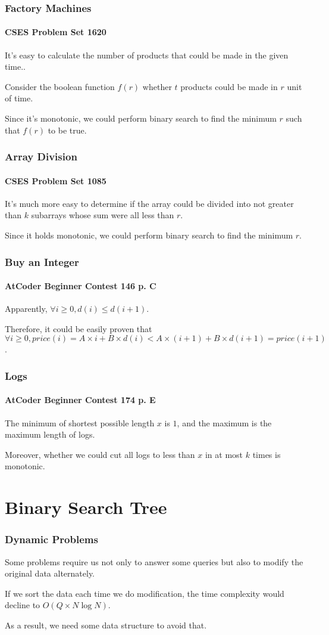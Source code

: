 \documentclass{beamer}
\begin{document}
\frame
{
	\frametitle{Factory Machines}
	\framesubtitle{CSES Problem Set 1620}
	
	It's easy to calculate the number of products that could be made in the given time.\pause.
	
	Consider the boolean function $f(r)$ whether $t$ products could be made in $r$ unit of time.\pause
	
	Since it's monotonic, we could perform binary search to find the minimum $r$ such that $f(r)$ to be true.
}

\frame
{
	\frametitle{Array Division}
	\framesubtitle{CSES Problem Set 1085}
	
	It's much more easy to determine if the array could be divided into not greater than $k$ subarrays whose sum were all less than $r$.\pause
	
	Since it holds monotonic, we could perform binary search to find the minimum $r$.
}

\frame
{
	\frametitle{Buy an Integer}
	\framesubtitle{AtCoder Beginner Contest 146 p. C}
	
	Apparently, $\forall i\geq 0, d(i)\leq d(i+1)$.\pause
	
	Therefore, it could be easily proven that $\forall i\geq 0, price(i) = A\times i+B\times d(i) < A\times(i+1)+B\times d(i+1) = price(i+1)$.
}

\frame
{
	\frametitle{Logs}
	\framesubtitle{AtCoder Beginner Contest 174 p. E}
	
	The minimum of shortest possible length $x$ is $1$, and the maximum is the maximum length of logs.\pause
	
	Moreover, whether we could cut all logs to less than $x$ in at most $k$ times is monotonic.
}

\section{Binary Search Tree}

\frame
{
	\frametitle{Dynamic Problems}
	
	Some problems require us not only to answer some queries but also to modify the original data alternately.
	
	If we sort the data each time we do modification, the time complexity would decline to $O(Q\times N\log N)$.
	
	As a result, we need some data structure to avoid that.
}
\end{document}
